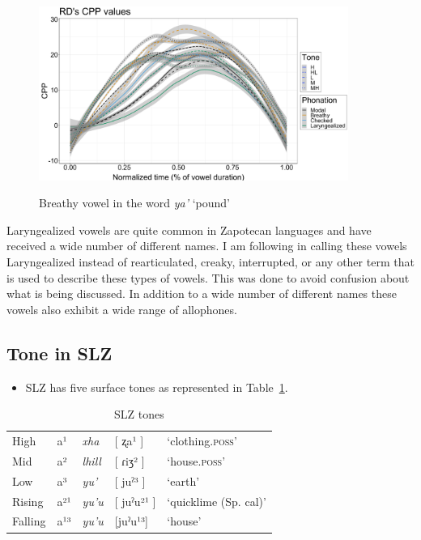 \documentclass[12pt, letterpaper]{article}
\providecommand{\lsptoprule}{\midrule\toprule}
\providecommand{\lspbottomrule}{\bottomrule\midrule}
\begin{document}
\begin{figure}[!h]
	\centering
	\includegraphics[width=0.9\textwidth]{../RDCPP_line.png}
	\label{fig:BreathyVowel}
	\caption{Breathy vowel in the word \textit{ya'} `pound'}
\end{figure}

Laryngealized vowels are quite common in Zapotecan languages and have received a wide number of different names. I am following \citet{avelinoAcousticElectroglottographicAnalyses2010} in calling these vowels Laryngealized instead of rearticulated, creaky, interrupted, or any other term that is used to describe these types of vowels. This was done to avoid confusion about what is being discussed. In addition to a wide number of different names these vowels also exhibit a wide range of allophones. 
\subsection{Tone in SLZ} \label{sec:Tone}

\begin{itemize}
	\item SLZ has five surface tones as represented in Table~\ref{tab:tones}.
\end{itemize}

\begin{table}[!h]
	\centering
	\caption{SLZ tones}
	\label{tab:tones}
	 \begin{tabular}{lllll}
	  \lsptoprule
	  High   	&  a¹  &  \textit{xha}   &  [ ʐa¹ ] & `clothing.\textsc{poss}'\\
		Mid    	&  a²  &  \textit{lhill} 	& [ ɾiʒ² ] & `house.\textsc{poss}' \\
		Low   	&  a³  &  \textit{yu'} 	&	 [ juˀ³ ] & `earth'\\
		Rising	&  a²¹  &  \textit{yu'u} 	&	[ juˀu²¹ ] & `quicklime (Sp. cal)' \\
		Falling &  a¹³  &  \textit{yu'u}  &	[juˀu¹³] &	`house' \\
	  \lspbottomrule
	 \end{tabular}
\end{table}
\end{document}
